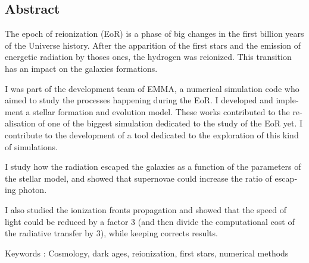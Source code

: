 \begin{otherlanguage}{english}
\chapter*{Abstract}
The epoch of reionization (EoR) is a phase of big changes in the first billion years of the Universe history. After the apparition of the first stars and the emission of energetic radiation by thoses ones, the hydrogen was reionized. This transition has an impact on the galaxies formations.

I was part of the development team of EMMA, a numerical simulation code who aimed to study the  processes happening during the EoR. I developed and implement a stellar formation and evolution model. These works contributed to the realisation of one of the biggest simulation dedicated to the study of the EoR yet. I contribute to the development of a tool dedicated to the exploration of this kind of simulations.

I study how the radiation escaped the galaxies as a function of the parameters of the stellar model, and showed that supernovae could increase the ratio of escaping photon.

I also studied the ionization fronts propagation and showed that the speed of light could be reduced by a factor 3 (and then divide the computational cost of the radiative transfer by 3), while keeping corrects results.

\vspace{0.5cm}

Keywords : Cosmology, dark ages, reionization, first stars, numerical methods
\end{otherlanguage}

\endgroup			

\vfill




